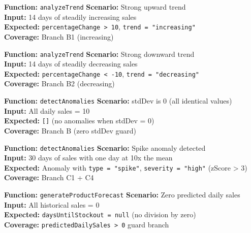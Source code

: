 \documentclass[12pt,a4paper]{report}
\newcommand{\ptwo}{\textbf{\color{p2orange}P2}}
\begin{document}
\begin{tcolorbox}[testbox,title={FORE-008 \hfill \ptwo}]
\textbf{Function:} \texttt{analyzeTrend} \quad \textbf{Scenario:} Strong upward trend \\
\textbf{Input:} 14 days of steadily increasing sales \\
\textbf{Expected:} \texttt{percentageChange > 10}, \texttt{trend = "increasing"} \\
\textbf{Coverage:} Branch B1 (increasing)
\end{tcolorbox}

\begin{tcolorbox}[testbox,title={FORE-009 \hfill \ptwo}]
\textbf{Function:} \texttt{analyzeTrend} \quad \textbf{Scenario:} Strong downward trend \\
\textbf{Input:} 14 days of steadily decreasing sales \\
\textbf{Expected:} \texttt{percentageChange < -10}, \texttt{trend = "decreasing"} \\
\textbf{Coverage:} Branch B2 (decreasing)
\end{tcolorbox}

\begin{tcolorbox}[testbox,title={FORE-010 \hfill \ptwo}]
\textbf{Function:} \texttt{detectAnomalies} \quad \textbf{Scenario:} stdDev is 0 (all identical values) \\
\textbf{Input:} All daily sales = 10 \\
\textbf{Expected:} \texttt{[]} (no anomalies when stdDev = 0) \\
\textbf{Coverage:} Branch B (zero stdDev guard)
\end{tcolorbox}

\begin{tcolorbox}[testbox,title={FORE-011 \hfill \ptwo}]
\textbf{Function:} \texttt{detectAnomalies} \quad \textbf{Scenario:} Spike anomaly detected \\
\textbf{Input:} 30 days of sales with one day at 10x the mean \\
\textbf{Expected:} Anomaly with \texttt{type = "spike"}, \texttt{severity = "high"} (zScore > 3) \\
\textbf{Coverage:} Branch C1 + C4
\end{tcolorbox}

\begin{tcolorbox}[testbox,title={FORE-012 \hfill \ptwo}]
\textbf{Function:} \texttt{generateProductForecast} \quad \textbf{Scenario:} Zero predicted daily sales \\
\textbf{Input:} All historical sales = 0 \\
\textbf{Expected:} \texttt{daysUntilStockout = null} (no division by zero) \\
\textbf{Coverage:} \texttt{predictedDailySales > 0} guard branch
\end{tcolorbox}
\end{document}
